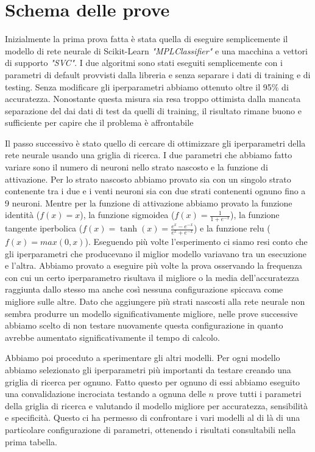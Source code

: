 \documentclass[a4paper,12pt]{report}
\begin{document}
\section{Schema delle prove}
Inizialmente la prima prova fatta è stata quella di eseguire semplicemente il
modello di rete neurale di Scikit-Learn {\it "MPLClassifier"} e una macchina a
vettori di supporto {\it "SVC"}. I due algoritmi sono stati eseguiti
semplicemente con i parametri di default provvisti dalla libreria e senza
separare i dati di training e di testing. Senza modificare gli iperparametri
abbiamo ottenuto oltre il 95\% di accuratezza. Nonostante questa misura sia resa
troppo ottimista dalla mancata separazione del dai dati di test da quelli di
training, il risultato rimane buono e sufficiente per capire che il problema è
affrontabile

Il passo successivo è stato quello di cercare di ottimizzare gli iperparametri
della rete neurale usando una griglia di ricerca. I due parametri che abbiamo
fatto variare sono il numero di neuroni nello strato nascosto e la funzione di
attivazione. Per lo strato nascosto abbiamo provato sia con un singolo strato
contenente tra i due e i venti neuroni sia con due strati contenenti ognuno fino
a 9 neuroni. Mentre per la funzione di attivazione abbiamo provato la funzione
identità ($f(x) = x$), la funzione sigmoidea ($f(x) = \frac{1}{1 + e^{-x}}$), la
funzione tangente iperbolica ($f(x)=\tanh(x) = \frac {e^x - e^{-x}} {e^x +
e^{-x}}$) e la funzione relu ($f(x) = max(0, x)$). Eseguendo più volte
l'esperimento ci siamo resi conto che gli iperparametri che producevano il
miglior modello variavano tra un esecuzione e l'altra. Abbiamo provato a
eseguire più volte la prova osservando la frequenza con cui un certo
iperparametro risultava il migliore o la media dell'accuratezza raggiunta dallo
stesso ma anche così nessuna configurazione spiccava come migliore sulle altre.
Dato che aggiungere più strati nascosti alla rete neurale non sembra produrre un
modello significativamente migliore, nelle prove successive abbiamo scelto di
non testare nuovamente questa configurazione in quanto avrebbe aumentato
significativamente il tempo di calcolo.

Abbiamo poi proceduto a sperimentare gli altri modelli. Per ogni modello abbiamo
selezionato gli iperparametri più importanti da testare creando una griglia di
ricerca per ognuno. Fatto questo per ognuno di essi abbiamo eseguito una
convalidazione incrociata testando a ognuna delle $n$ prove tutti i parametri
della griglia di ricerca e valutando il modello migliore per accuratezza,
sensibilità e specificità. Questo ci ha permesso di confrontare i vari modelli
al di là di una particolare configurazione di parametri, ottenendo i risultati
consultabili nella prima tabella.
\end{document}
